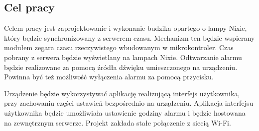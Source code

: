 \documentclass[../main.tex]{subfiles}
\begin{document}
 \subsection{Cel pracy}
 Celem pracy jest zaprojektowanie i wykonanie budzika opartego o lampy Nixie, który będzie synchronizowany z serwerem
  czasu. Mechanizm ten będzie wspierany modułem zegara czasu rzeczywistego wbudowanym w mikrokontroler. 
  Czas pobrany z serwera będzie wyświetlany na lampach Nixie. Odtwarzanie alarmu będzie realizowane za pomocą 
  źródła dźwięku umieszczonego na urządzeniu. Powinna być też możliwość wyłączenia alarmu za pomocą przycisku.
 
 Urządzenie będzie wykorzystywać aplikację realizującą interfejs użytkownika, przy zachowaniu części ustawień 
 bezpośrednio na urządzeniu. Aplikacja interfejsu użytkownika będzie umożliwiała ustawienie godziny alarmu i będzie hostowana na zewnętrznym serwerze. 
 Projekt zakłada stałe połączenie z siecią Wi-Fi.
 
 
\end{document}
